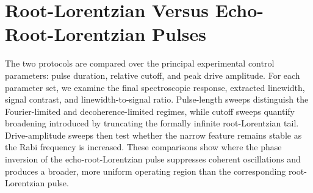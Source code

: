 \section{Root-Lorentzian Versus Echo-Root-Lorentzian Pulses}
\label{sec:lorentzian-echo-comparison}

The two protocols are compared over the principal experimental control
parameters: pulse duration, relative cutoff, and peak drive amplitude.  For
each parameter set, we examine the final spectroscopic response, extracted
linewidth, signal contrast, and linewidth-to-signal ratio.  Pulse-length
sweeps distinguish the Fourier-limited and decoherence-limited regimes, while
cutoff sweeps quantify broadening introduced by truncating the formally
infinite root-Lorentzian tail.  Drive-amplitude sweeps then test whether the narrow
feature remains stable as the Rabi frequency is increased.  These comparisons
show where the phase inversion of the echo-root-Lorentzian pulse suppresses
coherent oscillations and produces a broader, more uniform operating region
than the corresponding root-Lorentzian pulse.

